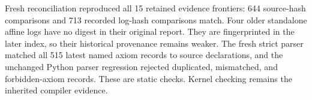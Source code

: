 Fresh reconciliation reproduced all 15 retained evidence frontiers: 644 source-hash comparisons and 713 recorded log-hash comparisons match. Four older standalone affine logs have no digest in their original report. They are fingerprinted in the later index, so their historical provenance remains weaker. The fresh strict parser matched all 515 latest named axiom records to source declarations, and the unchanged Python parser regression rejected duplicated, mismatched, and forbidden-axiom records. These are static checks. Kernel checking remains the inherited compiler evidence.
